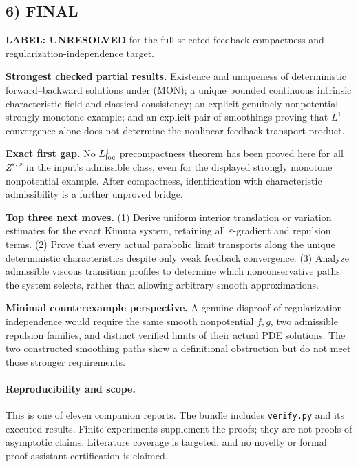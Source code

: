 \documentclass[11pt,a4paper]{article}
\theoremstyle{definition}
\theoremstyle{remark}
\begin{document}
\subsection*{6) FINAL}
\textbf{LABEL: UNRESOLVED} for the full selected-feedback compactness and regularization-independence target.

\textbf{Strongest checked partial results.} Existence and uniqueness of deterministic forward--backward solutions under (MON); a unique bounded continuous intrinsic characteristic field and classical consistency; an explicit genuinely nonpotential strongly monotone example; and an explicit pair of smoothings proving that $L^1$ convergence alone does not determine the nonlinear feedback transport product.

\textbf{Exact first gap.} No $L^1_{\rm loc}$ precompactness theorem has been proved here for all $Z^{\varepsilon,\phi}$ in the input's admissible class, even for the displayed strongly monotone nonpotential example. After compactness, identification with characteristic admissibility is a further unproved bridge.

\textbf{Top three next moves.} (1) Derive uniform interior translation or variation estimates for the exact Kimura system, retaining all $\varepsilon$-gradient and repulsion terms. (2) Prove that every actual parabolic limit transports along the unique deterministic characteristics despite only weak feedback convergence. (3) Analyze admissible viscous transition profiles to determine which nonconservative paths the system selects, rather than allowing arbitrary smooth approximations.

\textbf{Minimal counterexample perspective.} A genuine disproof of regularization independence would require the same smooth nonpotential $f,g$, two admissible repulsion families, and distinct verified limits of their actual PDE solutions. The two constructed smoothing paths show a definitional obstruction but do not meet those stronger requirements.

\paragraph{Reproducibility and scope.} This is one of eleven companion reports. The bundle includes \texttt{verify.py} and its executed results. Finite experiments supplement the proofs; they are not proofs of asymptotic claims. Literature coverage is targeted, and no novelty or formal proof-assistant certification is claimed.
\end{document}
